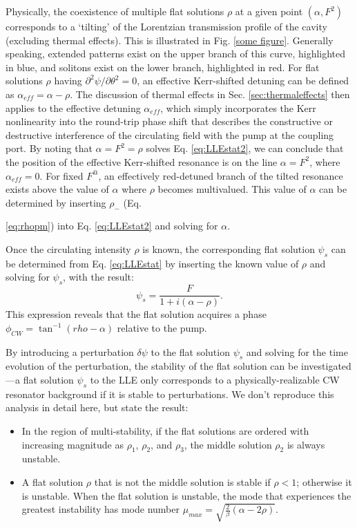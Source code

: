 Physically, the coexistence of multiple flat solutions $\rho$ at a given point $(\alpha,F^2)$ corresponds to a `tilting' of the Lorentzian transmission profile of the cavity (excluding thermal effects). This is illustrated in Fig. \ref{some figure}. Generally speaking, extended patterns exist on the upper branch of this curve, highlighted in blue, and solitons exist on the lower branch, highlighted in red. For flat solutions $\rho$ having $\partial^2\psi/\partial\theta^2=0$, an effective Kerr-shifted detuning can be defined as $\alpha_{eff}=\alpha-\rho$. The discussion of thermal effects in Sec. \ref{sec:thermaleffects} then applies to the effective detuning $\alpha_{eff}$, which simply incorporates the Kerr nonlinearity into the round-trip phase shift that describes the constructive or destructive interference of the circulating field with the pump at the coupling port. By noting that $\alpha=F^2=\rho$ solves Eq. \ref{eq:LLEstat2}, we can conclude that the position of the effective Kerr-shifted resonance is on the line $\alpha=F^2$, where $\alpha_{eff}=0$. For fixed $F^@$, an effectively red-detuned branch of the tilted resonance exists above the value of $\alpha$ where $\rho$ becomes multivalued. This value of $\alpha$ can be determined by inserting $\rho_-$ (Eq. {\ref{eq:rhopm}) into Eq. \ref{eq:LLEstat2} and solving for $\alpha$. 

Once the circulating intensity $\rho$ is known, the corresponding flat solution $\psi_s$ can be determined from Eq. \ref{eq:LLEstat} by inserting the known value of $\rho$ and solving for $\psi_s$, with the result:
\begin{equation}
\psi_s=\frac{F}{1+i(\alpha-\rho)}.\label{eq:LLEflatsoln}
\end{equation}
This expression reveals that the flat solution acquires a phase $\phi_{CW}=\tan^{-1}(rho-\alpha)$ relative to the pump.


By introducing a perturbation $\delta\psi$ to the flat solution $\psi_s$ and solving for the time evolution of the perturbation, the stability of the flat solution can be investigated---a flat solution $\psi_s$ to the LLE only corresponds to a physically-realizable CW resonator background if it is stable to perturbations. We don't reproduce this analysis in detail here, but state the result:
\begin{itemize}
	\item In the region of multi-stability, if the flat solutions are ordered with increasing magnitude as $\rho_1$, $\rho_2$, and $\rho_3$, the middle solution $\rho_2$ is always unstable. 
	\item A flat solution $\rho$ that is not the middle solution is stable if $\rho<1$; otherwise it is unstable. When the flat solution is unstable, the mode that experiences the greatest instability has mode number $\mu_{max}=\sqrt{\frac{2}{\beta}(\alpha-2\rho)}$.  
\end{itemize}

}
